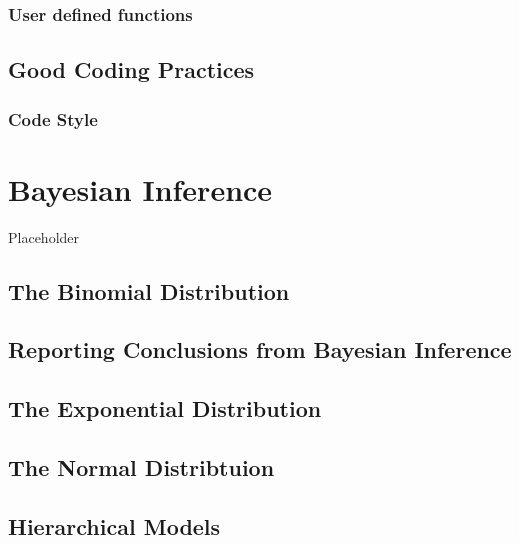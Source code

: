 \documentclass[
]{book}
\begin{document}
\hypertarget{user-defined-functions}{%
\subsection{User defined functions}\label{user-defined-functions}}

\hypertarget{good-coding-practices}{%
\section{Good Coding Practices}\label{good-coding-practices}}

\hypertarget{code-style}{%
\subsection{Code Style}\label{code-style}}

\hypertarget{bayesian-inference}{%
\chapter{Bayesian Inference}\label{bayesian-inference}}

Placeholder

\hypertarget{the-binomial-distribution}{%
\section{The Binomial Distribution}\label{the-binomial-distribution}}

\hypertarget{reporting-conclusions-from-bayesian-inference}{%
\section{Reporting Conclusions from Bayesian Inference}\label{reporting-conclusions-from-bayesian-inference}}

\hypertarget{the-exponential-distribution}{%
\section{The Exponential Distribution}\label{the-exponential-distribution}}

\hypertarget{the-normal-distribtuion}{%
\section{The Normal Distribtuion}\label{the-normal-distribtuion}}

\hypertarget{hierarchical-models}{%
\section{Hierarchical Models}\label{hierarchical-models}}
\end{document}
